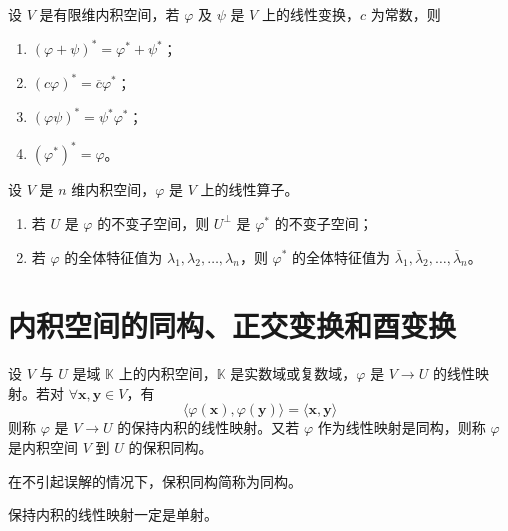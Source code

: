 \begin{theorem}
    设 $V$ 是有限维内积空间，若 $\varphi$ 及 $\psi$ 是 $V$ 上的线性变换，$c$ 为常数，则
    \begin{enumerate}
        \item $(\varphi + \psi)^* = \varphi^* + \psi^*$；
        \item $(c\varphi)^* = \overline{c}\varphi^*$；
        \item $(\varphi\psi)^* = \psi^{*}\varphi^{*}$；
        \item $(\varphi^*)^* = \varphi$。
    \end{enumerate}
\end{theorem}

\begin{proposition}
    设 $V$ 是 $n$ 维内积空间，$\varphi$ 是 $V$ 上的线性算子。
    \begin{enumerate}
        \item 若 $U$ 是 $\varphi$ 的不变子空间，则 $U^{\perp}$ 是 $\varphi^*$ 的不变子空间；
        \item 若 $\varphi$ 的全体特征值为 $\lambda_1, \lambda_2, \ldots, \lambda_n$，则 $\varphi^*$ 的全体特征值为 $\overline{\lambda}_1, \overline{\lambda}_2, \ldots, \overline{\lambda}_n$。
    \end{enumerate}
\end{proposition}



\section{内积空间的同构、正交变换和酉变换}

\begin{definition}
    设 $V$ 与 $U$ 是域 $\mathbb{K}$ 上的内积空间，$\mathbb{K}$ 是实数域或复数域，$\varphi$ 是 $V \to U$ 的线性映射。若对 $\forall \bm{x}, \bm{y} \in V$，有
    \[
        \langle \varphi(\bm{x}), \varphi(\bm{y}) \rangle = \langle \bm{x}, \bm{y} \rangle
    \]
    则称 $\varphi$ 是 $V \to U$ 的保持内积的线性映射。又若 $\varphi$ 作为线性映射是同构，则称 $\varphi$ 是内积空间 $V$ 到 $U$ 的保积同构。
\end{definition}

\begin{remark}
    在不引起误解的情况下，保积同构简称为同构。
\end{remark}

\begin{remark}
    保持内积的线性映射一定是单射。
\end{remark}

